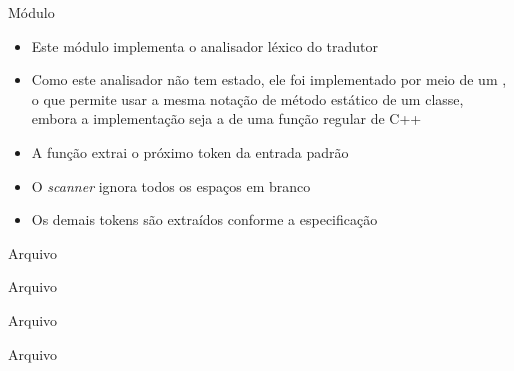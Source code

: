 \begin{frame}[fragile]{Módulo }

    \begin{itemize}
        \item Este módulo implementa o analisador léxico do tradutor

        \item Como este analisador não tem estado, ele foi implementado por meio de um , o que permite usar a mesma notação de método
            estático de um classe, embora a implementação seja a de uma função regular de C++

        \item A função  extrai o próximo token da entrada padrão

        \item O \textit{scanner} ignora todos os espaços em branco

        \item Os demais tokens são extraídos conforme a especificação
    \end{itemize}

\end{frame}

\begin{frame}[fragile]{Arquivo }
\end{frame}

\begin{frame}[fragile]{Arquivo }
\end{frame}

\begin{frame}[fragile]{Arquivo }
\end{frame}

\begin{frame}[fragile]{Arquivo }
\end{frame}

